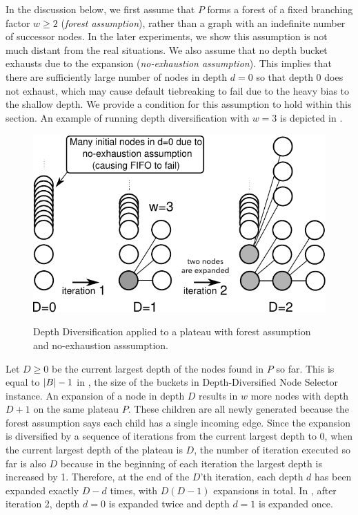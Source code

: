 % 
In the discussion below, 
we first assume that $P$ forms a forest of a fixed branching factor
$w\geq 2$ (\emph{forest assumption}), rather than a graph with an indefinite number of successor nodes.
In the later experiments, we show this assumption is not much distant from the real situations.
We also assume that no depth bucket exhausts due to the expansion (\emph{no-exhaustion assumption}). This implies that there are sufficiently large number of nodes in depth $d=0$ so that depth 0 does not exhaust, which may cause \fifo default tiebreaking to fail due to the heavy bias to the shallow depth.
We provide a condition for this assumption to hold within this section.
An example of running depth diversification with $w=3$ is depicted in .

\begin{figure}[htbp]
  \centering
  \includegraphics{img/depth-distribution-analysis.pdf}
 \label{fig:depth-distribution-analysis}
 \caption{Depth Diversification applied to a plateau 
with forest assumption and no-exhaustion asssumption.}
\end{figure}

Let $D\geq 0$ be the current largest depth of the nodes found in $P$ so far.
This is equal to ${\left|B\right|}-1$ in ,
the size of the buckets in Depth-Diversified Node Selector instance.
An expansion of a node in depth $D$ results in $w$ more nodes with depth $D+1$ on the same plateau $P$.
These children are all newly generated because the forest assumption says each child has a single incoming edge.
Since the expansion is
diversified by a sequence of iterations from the current largest depth to 0, when the current
largest depth of the plateau is $D$, the number of iteration executed so far is also $D$ because
in the beginning of each iteration the largest depth is increased by 1.
Therefore, at the end of the $D$'th iteration,
each depth $d$ has been expanded exactly $D-d$ times, with $D(D-1)$ expansions in total.
In ,
after iteration 2, depth $d=0$ is expanded twice and depth $d=1$ is expanded once.

